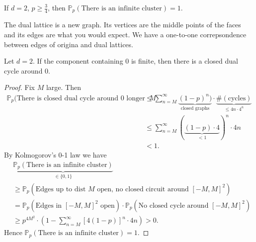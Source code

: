 \begin{fact}[]
    If \(d = 2\), \(p\geq \frac{3}{4}\), then \(\mathbb{P}_p(\text{There is an infinite cluster})=1\).
\end{fact}

\begin{defn}
    The dual lattice is a new graph. Its vertices are the middle points of the faces and its edges are what you would expect. We have a one-to-one correpsondence between edges of origina and dual lattices.
\end{defn}


\begin{fact}
    Let \(d=2\). If the component containing \(0\) is finite, then there is a closed dual cycle around 0. 
\end{fact}

\begin{proof}
    Fix \(M\) large. Then
    \begin{align*}
      \mathbb{P}_p(\text{There is closed dual cycle around 0 longer than \(M\)} & \leq \sum_{n=M}^{\infty} \underbrace{(1-p)^n)}_{\text{closed graphs}} \cdot \underbrace{\#(\text{cycles})}_{\leq 4n\cdot 4^n} \\
                                                                                & \leq \sum_{n=M}^{\infty} ( \underbrace{(1-p)\cdot 4}_{<1})^n \cdot 4n \\
                                                                                &< 1.
    \end{align*}
   By Kolmogorov's 0-1 law we have
   \begin{align*}
     &\underbrace{\mathbb{P}_p(\text{There is an infinite cluster})}_{\in \{0,1\}} \\
     &\geq \mathbb{P}_p(\text{Edges up to dist \(M\) open, no closed circuit around \([-M,M]^2\)}) \\
     &= \mathbb{P}_p(\text{Edges in \([-M,M]^2\) open})\cdot \mathbb{P}_p(\text{No closed cycle around \([-M,M]^2\)}) \\
     & \geq p^{4M^2} \cdot \left(1- \sum_{n=M}^{\infty} [4(1-p)]^n \cdot 4n\right) >0.
   \end{align*}
   Hence \(\mathbb{P}_p(\text{There is an infinite cluster})=1\).
\end{proof}

